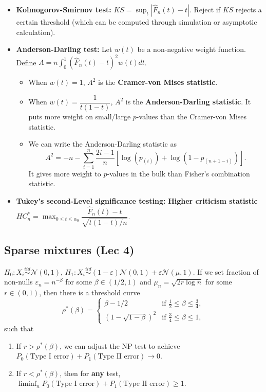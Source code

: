\documentclass[twoside]{article}
\newcommand\dis{\displaystyle}
\newcommand\calN{\mathcal{N}}
\def\eps{\varepsilon}
\newcommand\goesto{\rightarrow}
\begin{document}
\begin{itemize}
\item \textbf{Kolmogorov-Smirnov test:} $KS = \dis\sup_t |\widehat{F}_n(t) - t|$. Reject if $KS$ rejects a certain threshold (which can be computed through simulation or asymptotic calculation).

\item \textbf{Anderson-Darling test:} Let $w(t)$ be a non-negative weight function. Define $A = n \dis\int_0^1 \left(\widehat{F}_n(t) - t \right)^2 w(t) dt$.
\begin{itemize}
\item When $w(t) = 1$, $A^2$ is the \textbf{Cramer-von Mises statistic}.

\item When $w(t) = \dfrac{1}{t(1-t)}$, $A^2$ is the \textbf{Anderson-Darling statistic}. It puts more weight on small/large $p$-values than the Cramer-von Mises statistic.

\item We can write the Anderson-Darling statistic as
\[ A^2 = -n - \sum_{i=1}^n \frac{2i-1}{n} [\log (p_{(i)}) + \log(1 - p_{(n+1-i)})].\]
It gives more weight to $p$-values in the bulk than Fisher's combination statistic.
\end{itemize}

\item \textbf{Tukey's second-Level significance testing:} \textbf{Higher criticism statistic} $HC_n^* = \dis\max_{0 \leq t \leq \alpha_0} \dfrac{\widehat{F}_n(t) - t}{\sqrt{t(1-t)/n}}$.

\end{itemize}

\subsection{Sparse mixtures (Lec 4)}
$H_0: X_i \stackrel{iid}{\sim} \calN(0,1)$, $H_1: X_i \stackrel{iid}{\sim} (1-\eps)\calN(0,1) + \eps \calN(\mu, 1)$. If we set fraction of non-nulls $\eps_n = n^{-\beta}$ for some $\beta \in (1/2,1)$ and $\mu_n = \sqrt{2r \log n}$ for some $r \in (0,1)$, then there is a threshold curve
\[ \rho^*(\beta) = \begin{cases} \beta - 1/2 &\text{if } \frac{1}{2} \leq \beta \leq \frac{3}{4}, \\ (1 - \sqrt{1 - \beta})^2 &\text{if } \frac{3}{4} \leq \beta \leq 1, \end{cases} \]
such that
\begin{enumerate}
\item If $r > \rho^*(\beta)$, we can adjust the NP test to achieve $P_0 (\text{Type I error}) + P_1 (\text{Type II error}) \goesto 0$.

\item If $r < \rho^*(\beta)$, then for \textbf{any} test, $\dis\liminf_n P_0 (\text{Type I error}) + P_1 (\text{Type II error}) \geq 1$.
\end{enumerate}
\end{document}
